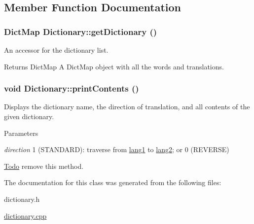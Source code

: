 \subsection{Member Function Documentation}
\hypertarget{classDictionary_a9696c9da75da8f8bfd1a1e2ff071c343}{
\subsubsection[{getDictionary}]{\setlength{\rightskip}{0pt plus 5cm}DictMap Dictionary::getDictionary ()}}
\label{classDictionary_a9696c9da75da8f8bfd1a1e2ff071c343}
An accessor for the dictionary list. \begin{DoxyReturn}{Returns}
DictMap A DictMap object with all the words and translations. 
\end{DoxyReturn}
\hypertarget{classDictionary_a2dbee36571908c93d96cfe885f25272e}{
\subsubsection[{printContents}]{\setlength{\rightskip}{0pt plus 5cm}void Dictionary::printContents ()}}
\label{classDictionary_a2dbee36571908c93d96cfe885f25272e}
Displays the dictionary name, the direction of translation, and all contents of the given dictionary. 
\begin{DoxyParams}{Parameters}
\item[{\em direction}]1 (STANDARD): traverse from \hyperlink{structlang1}{lang1} to \hyperlink{structlang2}{lang2}; or 0 (REVERSE) \end{DoxyParams}
\begin{Desc}
\item[\hyperlink{todo__todo000002}{Todo}]remove this method. \end{Desc}


The documentation for this class was generated from the following files:\begin{DoxyCompactItemize}
\item 
dictionary.h\item 
\hyperlink{dictionary_8cpp}{dictionary.cpp}\end{DoxyCompactItemize}
